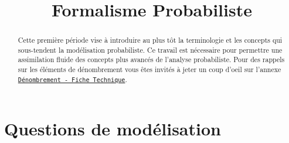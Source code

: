\documentclass[11pt, a4paper]{article}
\title{%
  { \huge Formalisme Probabiliste}%
}
\author{}
\date{}
\begin{document}
\maketitle\thispagestyle{fancy}

\begin{abstract}
  Cette première période vise à introduire au plus tôt la terminologie
  et les concepts qui sous-tendent la modélisation probabiliste. Ce
  travail est nécessaire pour permettre une assimilation fluide des
  concepts plus avancés de l'analyse probabiliste. Pour des rappels
  sur les éléments de dénombrement vous êtes invités à jeter un coup
  d'oeil sur l'annexe \href{periode_I_Annexe.pdf}{\texttt{Dénombrement
      - Fiche Technique}}.
\end{abstract}

\tableofcontents

\section{Questions de modélisation}
\label{sec:questionsModelisation}
\end{document}
